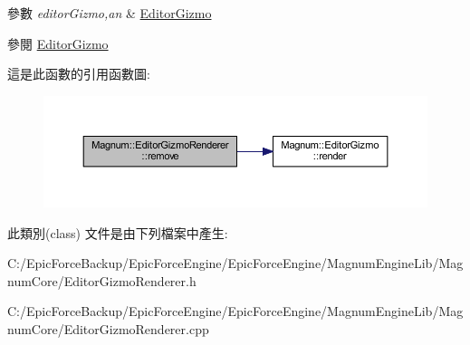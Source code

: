 \begin{DoxyParams}{參數}
{\em editor\+Gizmo,an} & \hyperlink{class_magnum_1_1_editor_gizmo}{Editor\+Gizmo} \\
\hline
\end{DoxyParams}
\begin{DoxySeeAlso}{參閱}
\hyperlink{class_magnum_1_1_editor_gizmo}{Editor\+Gizmo} 
\end{DoxySeeAlso}


這是此函數的引用函數圖\+:\nopagebreak
\begin{figure}[H]
\begin{center}
\leavevmode
\includegraphics[width=350pt]{class_magnum_1_1_editor_gizmo_renderer_a0dcf079b1b9e1ec5f2eed0da99cacffa_cgraph}
\end{center}
\end{figure}




此類別(class) 文件是由下列檔案中產生\+:\begin{DoxyCompactItemize}
\item 
C\+:/\+Epic\+Force\+Backup/\+Epic\+Force\+Engine/\+Epic\+Force\+Engine/\+Magnum\+Engine\+Lib/\+Magnum\+Core/Editor\+Gizmo\+Renderer.\+h\item 
C\+:/\+Epic\+Force\+Backup/\+Epic\+Force\+Engine/\+Epic\+Force\+Engine/\+Magnum\+Engine\+Lib/\+Magnum\+Core/Editor\+Gizmo\+Renderer.\+cpp\end{DoxyCompactItemize}

